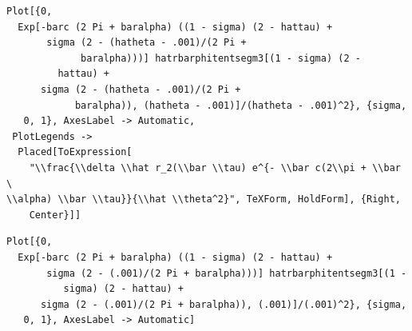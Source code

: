 \documentclass[reqno]{amsart}
\theoremstyle{definition} \newtheorem{definition}{Definition}[section]
\theoremstyle{definition} \newtheorem{remark}[definition]{Remark}
\theoremstyle{plain} \newtheorem{lemma}[definition]{Lemma}
\theoremstyle{plain} \newtheorem{proposition}[definition]{Proposition}
\theoremstyle{plain} \newtheorem{theorem}[definition]{Theorem}
\theoremstyle{plain} \newtheorem{corollary}[definition]{Corollary}
\theoremstyle{definition} \newtheorem{example}[definition]{Example}
\theoremstyle{plain} \newtheorem{claim}[clai]{Claim}
\theoremstyle{definition} \newtheorem{assumption}[definition]{Assumption}
\theoremstyle{definition} \newtheorem{observation}[definition]{Observation}
\newcommand{\1}{\mathbbm 1}
\newcommand{\sbig}{\bigskip}
\numberwithin{equation}{section} %
\theoremstyle{plain} \newtheorem*{theorem*}{Theorem}
\theoremstyle{plain} \newtheorem{mthm}[maintheorem]{Main Theorem}
\theoremstyle{plain} \newtheorem*{mthm*}{Main Theorem}
\theoremstyle{plain} \newtheorem*{conjecture*}{Conjecture}
\theoremstyle{plain} \newtheorem{conjecture}[definition]{Conjecture}
\theoremstyle{plain} \newtheorem*{problem*}{Problem}
\begin{document}
\begin{verbatim}
Plot[{0, 
  Exp[-barc (2 Pi + baralpha) ((1 - sigma) (2 - hattau) + 
       sigma (2 - (hatheta - .001)/(2 Pi + 
             baralpha)))] hatrbarphitentsegm3[(1 - sigma) (2 - 
         hattau) + 
      sigma (2 - (hatheta - .001)/(2 Pi + 
            baralpha)), (hatheta - .001)]/(hatheta - .001)^2}, {sigma,
   0, 1}, AxesLabel -> Automatic, 
 PlotLegends -> 
  Placed[ToExpression[
    "\\frac{\\delta \\hat r_2(\\bar \\tau) e^{- \\bar c(2\\pi + \\bar \
\\alpha) \\bar \\tau}}{\\hat \\theta^2}", TeXForm, HoldForm], {Right, 
    Center}]]
\end{verbatim}
\begin{verbatim}
Plot[{0, 
  Exp[-barc (2 Pi + baralpha) ((1 - sigma) (2 - hattau) + 
       sigma (2 - (.001)/(2 Pi + baralpha)))] hatrbarphitentsegm3[(1 -
          sigma) (2 - hattau) + 
      sigma (2 - (.001)/(2 Pi + baralpha)), (.001)]/(.001)^2}, {sigma,
   0, 1}, AxesLabel -> Automatic]
\end{verbatim}

\sbig


\sbig
\end{document}
